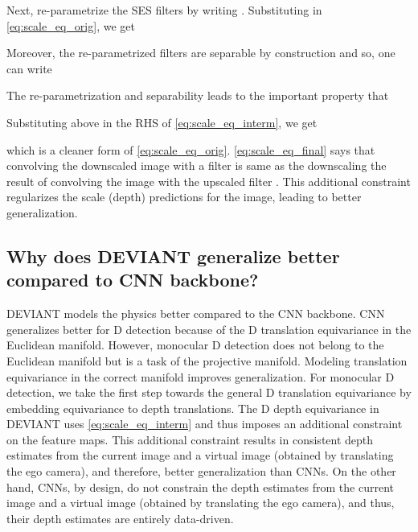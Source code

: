 \documentclass[runningheads]{llncs}
\newcommand{\twoD}{D}
\newcommand{\threeD}{D}
\newcommand{\equivariance}{equivariance}
\newcommand{\depthEquivariance} {depth \equivariance}
\newcommand{\methodName}{DEVIANT}
\begin{document}
        Next, \cite{sosnovik2020sesn} re-parametrize the SES filters by writing . 
        Substituting in \cref{eq:scale_eq_orig}, we get
        
        
        Moreover, the re-parametrized filters are separable \cite{sosnovik2020sesn} by construction and so, one can write
        
        
        The re-parametrization and separability leads to the important property that
        
        
        Substituting above in the RHS of \cref{eq:scale_eq_interm}, we get
        
        which is a cleaner form of \cref{eq:scale_eq_orig}.
        \cref{eq:scale_eq_final} says that convolving the downscaled image with a filter is same as the
        downscaling the result of convolving the image with the upscaled filter \cite{sosnovik2020sesn}. 
        This additional constraint regularizes the scale (depth) predictions for the image, leading to better generalization.
        


\subsection{Why does \methodName{} generalize better compared to CNN backbone?}\label{sec:why_better_generalize}
        \methodName{} models the physics better compared to the CNN backbone. 
        CNN generalizes better for \twoD{} detection because of the \twoD{} translation \equivariance{} in the Euclidean manifold.
        However, monocular \threeD{} detection does not belong to the Euclidean manifold but is a task of the projective manifold.
        Modeling translation \equivariance{} in the correct manifold improves generalization.
        For monocular \threeD{} detection, we take the first step towards the general \threeD{} translation \equivariance{} by embedding \equivariance{} to depth translations. 
        The \threeD{} \depthEquivariance{} in \methodName{} uses \cref{eq:scale_eq_interm} and thus imposes an additional constraint on the feature maps.
        This additional constraint results in consistent depth estimates from the current image and a virtual image (obtained by translating the ego camera), and therefore, better generalization than CNNs. 
        On the other hand, CNNs, by design, do not constrain the depth estimates from the current image and a virtual image (obtained by translating the ego camera), and thus, their depth estimates are entirely data-driven. 
\end{document}
